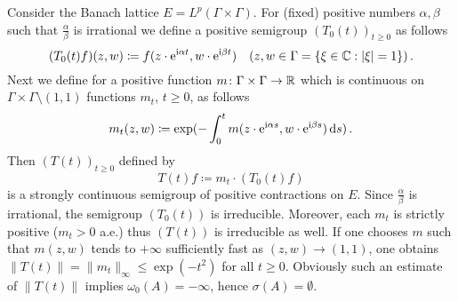 \begin{example}\label{ex:c3-3.6}

Consider the Banach lattice $E = L^{p}(\Gamma\times\Gamma)$.
For (fixed) positive numbers $\alpha,\beta$ such that $\frac{\alpha}{\beta}$ is irrational we define a positive semigroup $(T_{0}(t))_{t\geq 0}$ as follows
\begin{equation}\label{eq:c3-3.9}
	(T_{0}(t)f)(z,w) \coloneqq f(z\cdot \mathrm{e}^{\mathrm{i}\alpha t},w\cdot \mathrm{e}^{\mathrm{i}\beta t}) \quad (z,w \in \Gamma = \{\xi\in\mathbb{C} :|\xi|=1\})\,.
\end{equation}
Next we define for a positive function $m \colon \Gamma\times\Gamma \to \mathbb{R} $ which is continuous on $\Gamma\times\Gamma\setminus(1,1)$ functions $m_{t}$, $t\geq 0$, as follows
\begin{equation}\label{eq:c3-3.10}
	m_{t}(z,w) \coloneqq \exp(-\int_{0}^{t} m(z\cdot \mathrm{e}^{\mathrm{i}\alpha s},w\cdot \mathrm{e}^{\mathrm{i}\beta s})\mathop{}\!\mathrm{d}{s} )\,.
\end{equation}
Then $(T(t))_{t\geq 0}$ defined by
\begin{equation}\label{eq:c3-3.11}
	T(t)f \coloneqq m_{t}\cdot(T_{0}(t)f)
\end{equation}
is a strongly continuous semigroup of positive contractions on $E$.
Since $\frac{\alpha}{\beta}$ is irrational, the semigroup $(T_{0}(t))$ is irreducible.
Moreover, each $m_{t}$ is strictly positive (\ie  $m_{t} > 0$ a.e.) thus $(T(t))$ is irreducible as well.
If one chooses $m$ such that $m(z,w)$ tends to $+\infty$ sufficiently fast as $(z,w) \to (1,1)$, one obtains $\|T(t)\| = \|m_{t}\|_{\infty} \leq \exp(-t^{2})$ for all $t \geq 0$.
Obviously such an estimate of $\|T(t)\|$ implies $\omega_0(A) = -\infty$, hence $\sigma(A) = \emptyset$.
\end{example}
